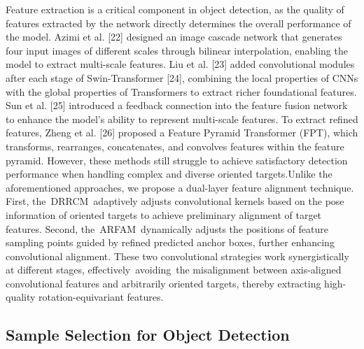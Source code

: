 \documentclass[10pt,twocolumn,final]{article}
\begin{document}
Feature extraction is a critical component in object detection, as the quality of features extracted by the network directly determines the overall performance of the model. Azimi et al. [22] designed an image cascade network that generates four input images of different scales through bilinear interpolation, enabling the model to extract multi-scale features. Liu et al. [23] added convolutional modules after each stage of Swin-Transformer [24], combining the local properties of CNNs with the global properties of Transformers to extract richer foundational features. Sun et al. [25] introduced a feedback connection into the feature fusion network to enhance the model's ability to represent multi-scale features. To extract refined features, Zheng et al. [26] proposed a Feature Pyramid Transformer (FPT), which transforms, rearranges, concatenates, and convolves features within the feature pyramid. However, these methods still struggle to achieve satisfactory detection performance when handling complex and diverse oriented targets.Unlike the aforementioned approaches, we propose a dual-layer feature alignment technique. First, the DRRCM adaptively adjusts convolutional kernels based on the pose information of oriented targets to achieve preliminary alignment of target features. Second, the ARFAM dynamically adjusts the positions of feature sampling points guided by refined predicted anchor boxes, further enhancing convolutional alignment. These two convolutional strategies work synergistically at different stages, effectively avoiding the misalignment between axis-aligned convolutional features and arbitrarily oriented targets, thereby extracting high-quality rotation-equivariant features.

\subsection{ Sample Selection for Object Detection }
\end{document}
